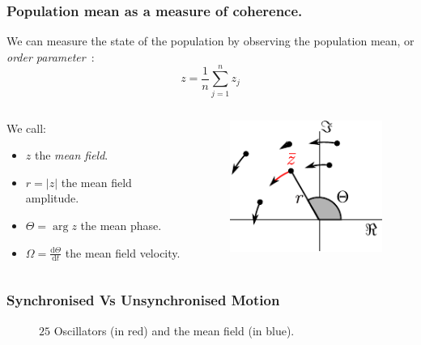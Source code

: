 \documentclass[10pt,reqno]{beamer}
\newcommand{\D}[2]{\frac{\mathrm{d} #1}{\mathrm{d} #2}}
\begin{document}
\begin{frame}
\frametitle{Population mean as a measure of coherence.}
We can measure the state of the population by observing the population mean, or {\em order parameter}~\cite{kuramoto75}:
\[
z = \frac{1}{n}\sum_{j=1}^n z_j
\]
\begin{columns}
\begin{column}{0.59\textwidth}
We call:
\begin{itemize}
	\item $z$ the {\em mean field}.
	\item $r=|z|$ the mean field amplitude.
	\item $\Theta = \arg{z}$ the mean phase.
	\item $\Omega = \D{\Theta}{t}$ the mean field velocity.
\end{itemize}
\end{column}
\begin{column}{0.39\textwidth}
\begin{figure}
	\includegraphics{meanfield.pdf}
\end{figure}
\end{column}
\end{columns}
\end{frame}
\begin{frame}
\frametitle{Synchronised Vs Unsynchronised Motion}
\begin{figure}
\caption{$25$ Oscillators (in red) and the mean field (in blue).}
\end{figure}
\end{frame}
\end{document}
